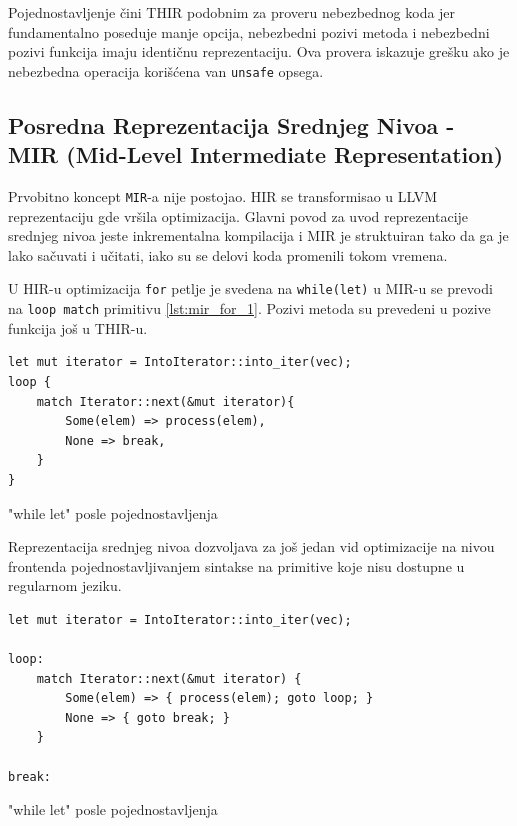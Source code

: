 \documentclass[11pt]{article}
\begin{document}
Pojednostavljenje čini THIR podobnim za proveru nebezbednog koda jer fundamentalno poseduje manje opcija, 
nebezbedni pozivi metoda i nebezbedni pozivi funkcija imaju identičnu reprezentaciju. Ova provera 
iskazuje grešku ako je nebezbedna operacija korišćena van \verb|unsafe| opsega.


\newpage
\subsection{Posredna Reprezentacija Srednjeg Nivoa - MIR (Mid-Level Intermediate Representation)}

Prvobitno koncept \verb|MIR|-a nije postojao. HIR se transformisao u LLVM reprezentaciju gde 
vršila optimizacija. Glavni povod za uvod reprezentacije srednjeg nivoa 
jeste inkrementalna kompilacija i MIR je struktuiran tako da ga je lako sačuvati i učitati, iako su se delovi
koda promenili tokom vremena.

U HIR-u optimizacija \verb|for| petlje je svedena na \verb|while(let)| u MIR-u se prevodi na \verb|loop match| 
primitivu \ref{lst:mir_for_1}.  Pozivi metoda su prevedeni u pozive funkcija još u THIR-u.

\begin{listing}[H]
\begin{verbatim}
let mut iterator = IntoIterator::into_iter(vec);
loop {
    match Iterator::next(&mut iterator){
        Some(elem) => process(elem),
        None => break,
    }
}
\end{verbatim}
\caption{"while let" posle pojednostavljenja}
\label{lst:mir_for_1}
\end{listing}

Reprezentacija srednjeg nivoa dozvoljava za još jedan vid optimizacije na nivou frontenda pojednostavljivanjem
sintakse na primitive koje nisu dostupne u regularnom jeziku.

\begin{listing}[H]
\begin{verbatim}
let mut iterator = IntoIterator::into_iter(vec);

loop:
    match Iterator::next(&mut iterator) {
        Some(elem) => { process(elem); goto loop; }
        None => { goto break; }
    }

break:
\end{verbatim}
\caption{"while let" posle pojednostavljenja}
\label{lst:mir_for_2}
\end{listing}
\end{document}
